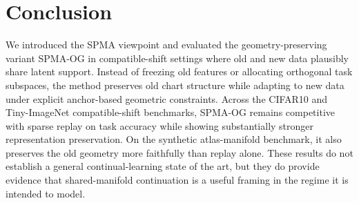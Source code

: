 \documentclass[11pt]{article}
\newcommand{\method}{\textsc{SPMA-OG}}
\newcommand{\spma}{\textsc{SPMA}}
\begin{document}
\section{Conclusion}
We introduced the \spma{} viewpoint and evaluated the geometry-preserving variant \method{} in compatible-shift settings where old and new data plausibly share latent support. Instead of freezing old features or allocating orthogonal task subspaces, the method preserves old chart structure while adapting to new data under explicit anchor-based geometric constraints. Across the CIFAR10 and Tiny-ImageNet compatible-shift benchmarks, \method{} remains competitive with sparse replay on task accuracy while showing substantially stronger representation preservation. On the synthetic atlas-manifold benchmark, it also preserves the old geometry more faithfully than replay alone. These results do not establish a general continual-learning state of the art, but they do provide evidence that shared-manifold continuation is a useful framing in the regime it is intended to model.



\end{document}
